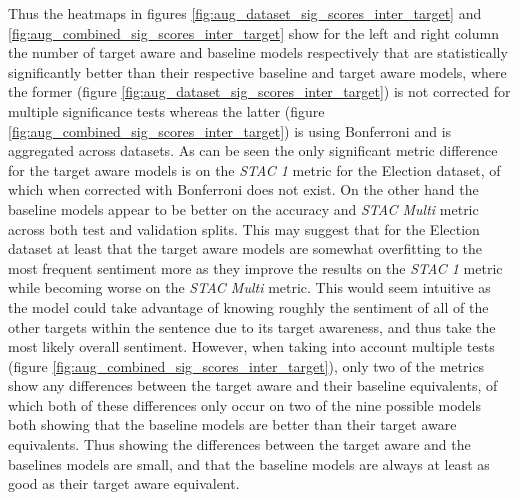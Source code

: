 Thus the heatmaps in figures \ref{fig:aug_dataset_sig_scores_inter_target} and \ref{fig:aug_combined_sig_scores_inter_target} show for the left and right column the number of target aware and baseline models respectively that are statistically significantly better than their respective baseline and target aware models, where the former (figure \ref{fig:aug_dataset_sig_scores_inter_target}) is not corrected for multiple significance tests whereas the latter (figure \ref{fig:aug_combined_sig_scores_inter_target}) is using
Bonferroni and is aggregated across datasets. As can be seen the only significant metric difference for the target aware models is on the \textit{STAC 1} metric for the Election dataset, of which when corrected with Bonferroni does not exist. On the other hand the baseline models appear to be better on the accuracy and \textit{STAC Multi} metric across both test and validation splits. This may suggest that for the Election dataset at least that the target aware models are somewhat overfitting to the most frequent sentiment more as they improve the results on the \textit{STAC 1} metric while becoming worse on the \textit{STAC Multi} metric. This would seem intuitive as the model could take advantage of knowing roughly the sentiment of all of the other targets within the sentence due to its target awareness, and thus take the most likely overall sentiment. However, when taking into account multiple tests (figure \ref{fig:aug_combined_sig_scores_inter_target}), only two of the metrics show any differences between the target aware and their baseline equivalents, of which both of these differences only occur on two of the nine possible models both showing that the baseline models are better than their target aware equivalents. Thus showing the differences between the target aware and the baselines models are small, and that the baseline models are always at least as good as their target aware equivalent.

